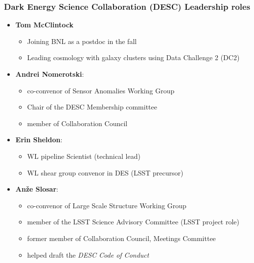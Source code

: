 \documentclass[aspectratio=169]{beamer}
\begin{document}
\begin{frame}
    \frametitle{Dark Energy Science Collaboration (DESC) Leadership roles}

    \begin{itemize}

        \item \textbf{Tom McClintock}
            \begin{itemize}
                \item Joining BNL as a postdoc in the fall
                \item Leading cosmology with galaxy
                    clusters using Data Challenge 2 (DC2)
            \end{itemize}

        \item \textbf{Andrei Nomerotski}:
            \begin{itemize}
                \item co-convenor of Sensor Anomalies Working Group
                \item Chair of the DESC Membership committee
                \item member of Collaboration Council
            \end{itemize}


        \item \textbf{Erin Sheldon}:
            \begin{itemize}
                \item WL pipeline Scientist (technical lead)
                \item WL shear group convenor in DES (LSST precursor)
            \end{itemize}

        \item \textbf{An\v{z}e Slosar}: 
            \begin{itemize}
                \item co-convenor of Large Scale Structure Working Group
                \item member of the LSST Science Advisory Committee (LSST project role)
                \item former member of Collaboration Council, Meetings Committee
                \item helped draft the \emph {DESC Code of Conduct}

            \end{itemize}

    \end{itemize}

\end{frame}
\end{document}
